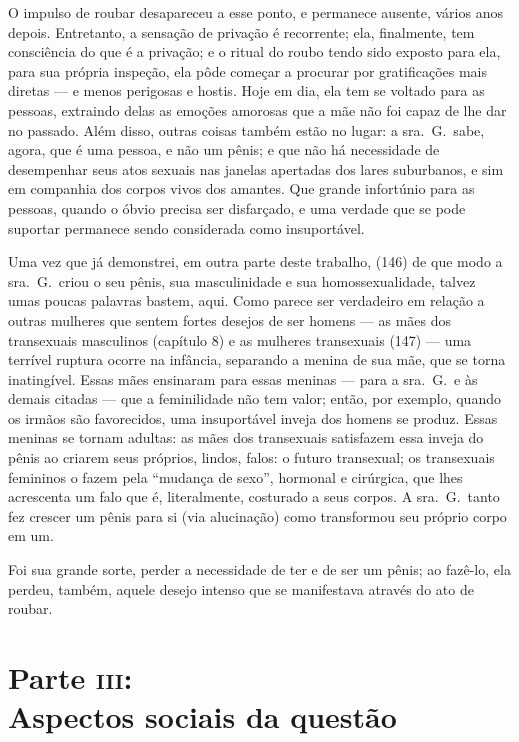 \begin{quote}
\end{quote}

\bigskip

O impulso de roubar desapareceu a esse ponto, e permanece ausente,
vários anos depois. Entretanto, a sensação de privação é recorrente;
ela, finalmente, tem consciência do que é a privação; e o ritual do
roubo tendo sido exposto para ela, para sua própria inspeção, ela pôde
começar a procurar por gratificações mais diretas --- e menos
perigosas e hostis. Hoje em dia, ela tem se voltado para as pessoas,
extraindo delas as emoções amorosas que a mãe não foi capaz de lhe dar
no passado. Além disso, outras coisas também estão no lugar: a sra.~G.~sabe, agora, que é uma pessoa, e não um pênis; e que não há
necessidade de desempenhar seus atos sexuais nas janelas apertadas dos
lares suburbanos, e sim em companhia dos corpos vivos dos amantes. Que
grande infortúnio para as pessoas, quando o óbvio precisa ser
disfarçado, e uma verdade que se pode suportar permanece sendo
considerada como insuportável.

Uma vez que já demonstrei, em outra parte deste trabalho, (146) de
que modo a sra.~G.~criou o seu pênis,\idxpenisimag{} sua masculinidade e sua
homossexualidade, talvez umas poucas palavras bastem, aqui. Como parece
ser verdadeiro em relação a outras mulheres que sentem fortes desejos
de ser homens --- as mães\idxmaesfilh{} dos transexuais masculinos (capítulo 8) e as
mulheres transexuais (147) --- uma terrível ruptura ocorre na
infância, separando a menina de sua mãe, que se torna inatingível.
Essas mães ensinaram para essas meninas --- para a sra.~G.~e às demais
citadas --- que a feminilidade não tem valor; então, por exemplo,
quando os irmãos são favorecidos, uma insuportável inveja dos homens se
produz. Essas meninas se tornam adultas: as mães dos transexuais
satisfazem essa inveja do pênis ao criarem seus próprios, lindos,
falos:\idxmaesfalo{} o futuro transexual; os transexuais femininos o fazem pela
``mudança de sexo'', hormonal e cirúrgica,
que lhes acrescenta um falo que é, literalmente, costurado a seus
corpos. A sra.~G.~tanto fez crescer um pênis para si (via alucinação)
como transformou seu próprio corpo em um.

Foi sua grande sorte, perder a necessidade de ter e de ser um pênis;
ao fazê-lo, ela perdeu, também, aquele desejo intenso que se
manifestava através do ato de roubar.


\part[Parte \textsc{iii}: Aspectos sociais da questão]{Parte \textsc{iii}:\\ Aspectos sociais da questão}


